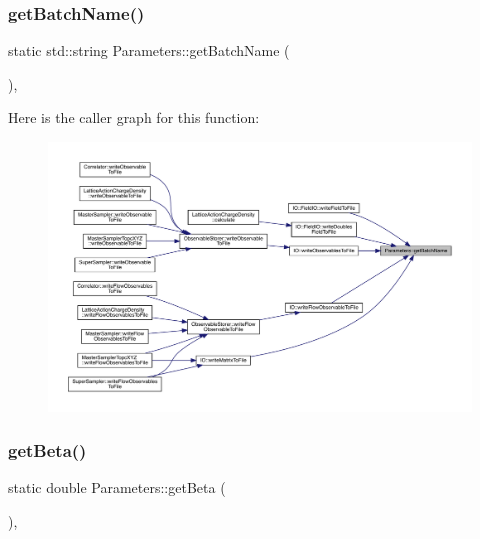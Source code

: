 \subsubsection{\texorpdfstring{getBatchName()}{getBatchName()}}
{\footnotesize\ttfamily static std\+::string Parameters\+::get\+Batch\+Name (\begin{DoxyParamCaption}{ }\end{DoxyParamCaption})\hspace{0.3cm}{\ttfamily [inline]}, {\ttfamily [static]}}

Here is the caller graph for this function\+:\nopagebreak
\begin{figure}[H]
\begin{center}
\leavevmode
\includegraphics[width=350pt]{class_parameters_a181a773d23fdb19d0c4f35e6cf2d5649_icgraph}
\end{center}
\end{figure}
\mbox{\label{class_parameters_ae5c64523dc50dca13b417fe3d9e4175c}} 
\subsubsection{\texorpdfstring{getBeta()}{getBeta()}}
{\footnotesize\ttfamily static double Parameters\+::get\+Beta (\begin{DoxyParamCaption}{ }\end{DoxyParamCaption})\hspace{0.3cm}{\ttfamily [inline]}, {\ttfamily [static]}}

